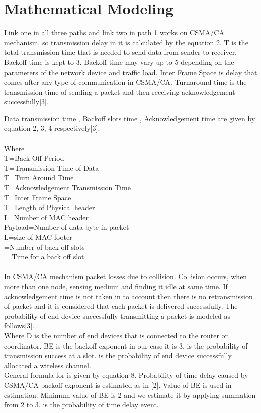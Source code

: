 \documentclass[11pt, conference, compsocconf, onecolumn]{IEEEtran}
\begin{document}
\section{Mathematical Modeling}
Link one in all three paths and link two in path 1 works on CSMA/CA mechanism, so transmission delay in it is calculated by the equation 2. T is the total transmission time that is needed to send data from sender to receiver. Backoff time is kept to 3. Backoff time may vary up to 5 depending on the parameters of the network device and traffic load. Inter Frame Space is delay that comes after any type of communication in CSMA/CA. Turnaround time is the transmission time of sending a packet and then receiving acknowledgement successfully[3].


Data transmission time , Backoff slots time , Acknowledgement time  are given by equation 2, 3, 4 respectively[3].
\\

\\
Where
\\
T=Back Off Period
\\
T=Transmission Time of Data
\\
T=Turn Around Time
\\
T=Acknowledgement Transmission Time
\\
T=Inter Frame Space
\\
T=Length of Physical header
\\
L=Number of MAC header
\\
Payload=Number of data byte in packet
\\
L=size of MAC footer
\\
=Number of back off slots
\\
= Time for a back off slot
\\\\
\indent In CSMA/CA mechanism packet losses due to collision. Collision occurs, when more than one node, sensing medium and finding it idle at same time. If acknowledgement time is not taken in to account then there is no retransmission of packet and it is considered that each packet is delivered successfully.
The probability of end device successfully transmitting a packet is modeled as follows[3].
\\

\indent Where D is the number of end devices that is connected to the router or coordinator. BE is the backoff exponent in our case it is 3.  is the probability of transmission success at a slot.  is the probability of end device successfully allocated a wireless channel.\\
\indent General formula for  is given by equation 8. Probability of time delay caused by CSMA/CA backoff exponent is estimated as in [2]. Value of BE is used in estimation. Minimum value of BE is 2 and we estimate it by applying summation from 2 to 3.  is the probability of time delay event.
\\
\end{document}
